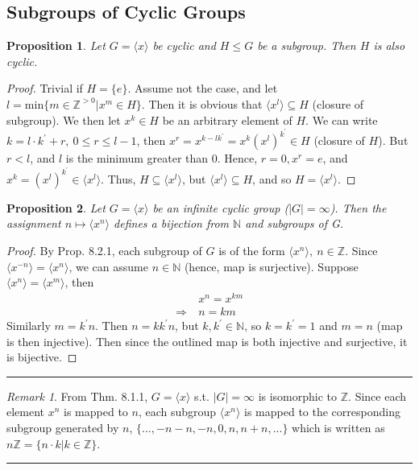 \documentclass{article}
\newtheorem{theorem}{Proposition}[section]
\theoremstyle{definition}
\theoremstyle{remark}
\newtheorem*{remark}{Remark}
\begin{document}
\subsection{Subgroups of Cyclic Groups}
\begin{theorem}
	Let $G=\langle x\rangle$ be cyclic and $H\leq G$ be a subgroup. Then $H$ is also cyclic.\\
\end{theorem}
\begin{proof}
	Trivial if $H=\lbrace e\rbrace$. Assume not the case, and let $l=\mathrm{min}\lbrace m\in\mathbb{Z}^{>0}|x^m\in H\rbrace $. Then it is obvious that $\langle x^l\rangle\subseteq H$ (closure of subgroup). We then let $x^k \in H$ be an arbitrary element of $H$. We can write $k=l\cdot k^{\prime}+r,~0\leq r\leq l-1$, then $x^r=x^{k-lk^{\prime}}=x^k(x^l)^{k^{\prime}}\in H$ (closure of $H$). But $r<l$, and $l$ is the minimum greater than $0$. Hence, $r=0,x^r=e$, and $x^k=(x^l)^{k^{\prime}}\in \langle x^l\rangle$.
	Thus, $H\subseteq\langle x^l\rangle$, but $\langle x^l\rangle\subseteq H$, and so $H=\langle x^l\rangle$.
\end{proof}
\begin{theorem}
	Let $G=\langle x\rangle$ be an infinite cyclic group ($|G|=\infty$). Then the assignment $n\mapsto\langle x^n\rangle$ defines a bijection from $\mathbb{N}$ and subgroups of G.\\
\end{theorem}
\begin{proof}
	By Prop. 8.2.1, each subgroup of $G$ is of the form $\langle x^n\rangle,~ n\in\mathbb{Z}$. Since $\langle x^{-n}\rangle = \langle x^n\rangle$, we can assume $n\in \mathbb{N}$ (hence, map is surjective). Suppose $\langle x^n\rangle=\langle x^m\rangle$, then
	\begin{align*}
		             & x^n=x^{km} \\
		\Rightarrow~ & n=km
	\end{align*}
	Similarly $m=k^{\prime}n$. Then $n=kk^{\prime}n$, but $k,k^{\prime}\in \mathbb{N}$, so $k=k^{\prime}=1$ and $m=n$ (map is then injective). Then since the outlined map is both injective and surjective, it is bijective.
\end{proof}
\hrule
\vspace{2mm}
\begin{remark}
	From Thm. 8.1.1, $G=\langle x\rangle$ s.t. $|G|=\infty$ is isomorphic to $\mathbb{Z}$. Since each element $x^n$ is mapped to $n$, each subgroup $\langle x^n\rangle$ is mapped to the corresponding subgroup generated by $n$, $\lbrace ..., -n-n, -n, 0, n, n+n,...\rbrace$ which is written as $n\mathbb{Z}=\lbrace n\cdot k | k\in \mathbb{Z}\rbrace$.\\
\end{remark}
\hrule
\newpage
\end{document}
